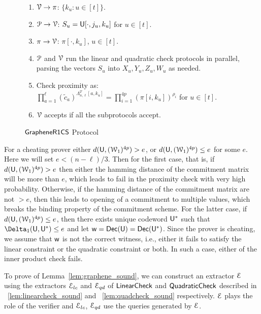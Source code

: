 \begin{figure}[h!]
{\begin{framed}
\begin{enumerate}[{\rm 1.}]
				\item $\mathcal{V}\rightarrow\pi$: $\{k_u:u\in [t]\}$.
				\item $\mathcal{P}\rightarrow\mathcal{V}$: $S_u=\mathsf{U}[\cdot,j_u,k_u]$ for $u\in [t]$.
				\item $\pi\rightarrow\mathcal{V}$: $\pi[\cdot,k_u]$, $u\in [t]$.
				\item $\mathcal{P}$ and $\mathcal{V}$ run the linear and quadratic check protocols in	parallel, parsing the vectors $S_u$ into $X_u,Y_u,Z_u,W_u$ as needed.
				\item Check proximity as: $\prod_{a=1}^\ell	(\tilde{c}_a)^{\Lambda_{n,\ell}^T[a,k_u]}=\prod_{i=1}^{4p}(\pi[i,k_u])^{\rho_i}$ for $u\in [t]$.
				\item $\mathcal{V}$ accepts if all the subprotocols accept.
			\end{enumerate}
		\end{framed}
	}
	\caption{$\mathsf{GrapheneR1CS}$ Protocol}
	\label{fig:graphene}
\end{figure}
For a cheating prover either $d(\mathsf{U}, (\mathcal{W}_1)^{4p}) > e$, or $d(\mathsf{U}, (\mathcal{W}_1)^{4p}) \leq e$ for some $e$. Here we will set $e < (n - \ell)/3$. Then for the first case, that is, if $d(\mathsf{U}, (\mathcal{W}_1)^{4p}) > e$ then either the hamming distance of the commitment matrix will be more than $e$, which leads to fail in the proximity check with very high probability. Otherwise, if the hamming distance of the commitment matrix are not $> e$, then this leads to opening of a commitment to multiple values, which breaks the binding property of the commitment scheme.
For the latter case, if $d(\mathsf{U}, (\mathcal{W}_1)^{4p}) \leq e$, then there exists unique codeword $\mathsf{U}^\ast$ such that $\Delta_1(\ewit, \ewit^\ast) \leq e$ and let $\mathsf{w} = \mathsf{Dec}(\mathsf{U}) = \mathsf{Dec}(\mathsf{U}^\ast)$. Since the prover is cheating, we assume that $\mathsf{w}$ is not the correct witness, i.e., either it fails to satisfy the linear constraint or the quadratic constraint or both. In such a case, either of the inner product check fails.

To prove of Lemma~\ref{lem:graphene_sound}, we can construct an extractor $\mathcal{E}$ using the extractors $\mathcal{E}_{lc}$ and $\mathcal{E}_{qd}$ of $\mathsf{LinearCheck}$ and $\mathsf{QuadraticCheck}$ described in ~\ref{lem:linearcheck_sound} and ~\ref{lem:quadcheck_sound} respectively. $\mathcal{E}$ plays the role of the verifier and $\mathcal{E}_{lc}$, $\mathcal{E}_{qd}$ use the queries generated by $\mathcal{E}$.

